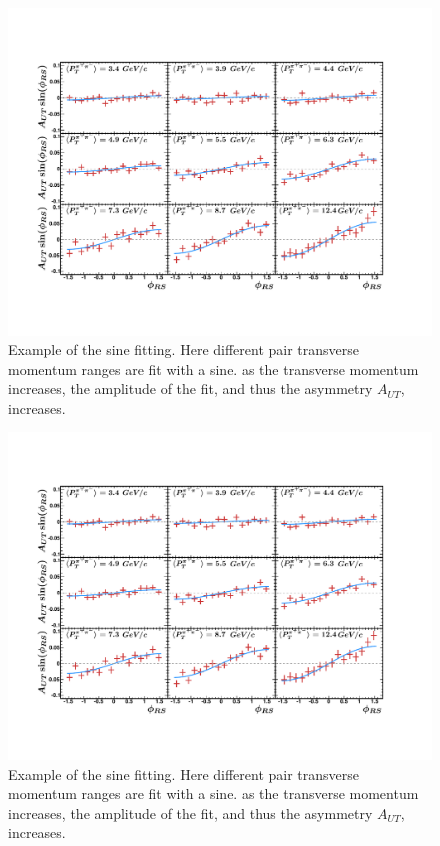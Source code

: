 \documentclass[abstract = on,listof=totoc, bibliography=totoc]{scrreprt}
\newcommand{\ptpair}{P_{T}^{\pi^+\pi^-}}
\newcommand{\pip}{\pi^+}
\newcommand{\pim}{\pi^-}
\newcommand{\pair}{$\pip\pim$ }
\begin{document}
\begin{figure}
\begin{center}
\includegraphics[width = 1\textwidth]{sinFit3}
\caption[Sinusoid modulation of \pair pair produciton and fit for 9 $\ptpair$ bins]{Example of the sine fitting. Here different pair transverse momentum ranges are fit with a sine. as the transverse momentum increases, the amplitude of the fit, and thus the asymmetry $A_{UT}$, increases.}
\label{fig:sinFit}
\end{center}
\end{figure}

\begin{figure}
\begin{center}
\includegraphics[width = 1\textwidth]{sinFit3}
\caption[Sinusoid modulation of \pair pair produciton and fit for 9 $\ptpair$ bins]{Example of the sine fitting. Here different pair transverse momentum ranges are fit with a sine. as the transverse momentum increases, the amplitude of the fit, and thus the asymmetry $A_{UT}$, increases.}
\label{fig:sinFit}
\end{center}
\end{figure}
\end{document}
